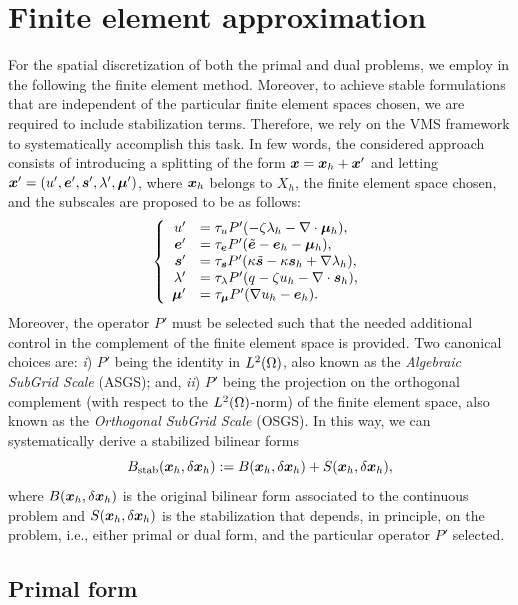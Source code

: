 
\section{Finite element approximation}

For the spatial discretization of both the primal and dual problems, we employ in the following the finite element method. Moreover, to achieve stable formulations that are independent of the particular finite element spaces chosen, we are required to include stabilization terms. Therefore, we rely on the VMS framework to systematically accomplish this task. In few words, the considered approach consists of introducing a splitting of the form $\bm{x} = \bm{x}_h+\bm{x}'$ and letting $\bm{x}' = (u',\bm{e}',\bm{s}',\lambda',\bm{\mu}')$, where $\bm{x}_h$ belongs to $X_h$, the finite element space chosen,  and the subscales are
proposed to be as follows:
\begin{equation}
\left\lbrace
\begin{array}{rl}
    u' &= \tau_{u}P'(-\zeta\lambda_h-\nabla\cdot\bm{\mu}_h),\\
    \bm{e}' &= \tau_{\bm{e}}P'(\tilde{\bm{e}}-\bm{e}_h-\bm{\mu}_h),\\
    \bm{s}' &= \tau_{\bm{s}}P'(\kappa\tilde{\bm{s}}-\kappa\bm{s}_h+\nabla\lambda_h),\\
    \lambda' &= \tau_{\lambda}P'(q-\zeta u_h-\nabla\cdot\bm{s}_h),\\
    \bm{\mu}' &= \tau_{\bm{\mu}}P'(\nabla u_h-\bm{e}_h).
    \end{array}
\right.
\label{eq:subscales}
\end{equation}
Moreover, the operator $P'$ must be selected such that the needed additional control in the complement of the finite element space is provided. Two canonical choices are: \textit{i}) $P'$ being the identity in $L^2(\Omega)$, also known as the \textit{Algebraic SubGrid Scale} (ASGS); and, \textit{ii}) $P'$ being 
the projection on the orthogonal complement (with respect to the $L^2(\Omega)$-norm) of the finite element space, also known as the \textit{Orthogonal SubGrid Scale} (OSGS). 
In this way, we can systematically derive a stabilized bilinear forms
$$
B_\mathrm{stab}(\bm{x}_h, \delta \bm{x}_h) := 
B(\bm{x}_h, \delta \bm{x}_h) + S(\bm{x}_h, \delta \bm{x}_h), 
$$
where $B(\bm{x}_h, \delta \bm{x}_h)$ is the original bilinear form associated to the continuous problem and $S(\bm{x}_h, \delta \bm{x}_h)$  is the stabilization that depends, in principle, on the problem, i.e., either primal or dual form, and the particular operator $P'$ selected. 
\subsection{Primal form} \label{sec:anal_primal}

